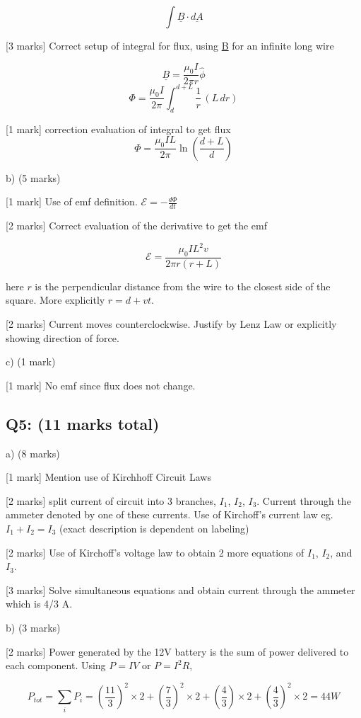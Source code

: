 \documentclass[a4paper,11pt]{article}
\begin{document}
\[ \int \underline{B} \cdot \underline{dA} \]

[3 marks] Correct setup of integral for flux, using \underline{B} for an infinite long wire 
 
\[ \underline{B} = \frac{\mu_0 I}{2\pi r} \hat{\phi} \]
\[ \Phi = \frac{\mu_0 I}{2\pi} \int_{d}^{d+L} \frac{1}{r} \, (L \, dr) \]

[1 mark] correction evaluation of integral to get flux
\[ \Phi = \frac{\mu_0 I L}{2\pi}\ln\left ( \frac{d+L}{d} \right ) \]

b) (5 marks)

[1 mark] Use of emf definition.  \( \mathcal{E} = - \frac{d\Phi}{dt} \)

[2 marks] Correct evaluation of the derivative to get the emf

\[ \mathcal{E} = \frac{\mu_0 I L^2 v}{2\pi r (r+L)} \]

here \( r \) is the perpendicular distance from the wire to the closest side of the square. More explicitly \( r = d + vt \).

[2 marks] Current moves counterclockwise. Justify by Lenz Law or explicitly showing direction of force.

c) (1 mark)

[1 mark] No emf since flux does not change.

\subsection*{Q5: (11 marks total)}

a) (8 marks)

[1 mark] Mention use of Kirchhoff Circuit Laws 

[2 marks] split current of circuit into 3 branches, \( I_1 \), \( I_2 \), \( I_3 \). Current through the ammeter denoted by one of these currents. Use of Kirchoff’s current law eg. \( I_1 + I_2 = I_3 \) (exact description is dependent on labeling)

[2 marks] Use of Kirchoff’s voltage law to obtain 2 more equations of  \( I_1 \), \( I_2 \), and \( I_3 \).

[3 marks] Solve simultaneous equations and obtain current through the ammeter which is 4/3 A. 

b)  (3 marks)

[2 marks] Power generated by the 12V battery is the sum of power delivered to each component. Using \( P = IV \) or \( P = I^2 R \),

\[ P_{tot} = \sum_{i} P_i = \left ( \frac{11}{3} \right )^2 \times 2 + \left ( \frac{7}{3} \right )^2 \times 2 + \left ( \frac{4}{3} \right ) \times 2 + \left ( \frac{4}{3} \right )^2 \times 2 = 44 W \]
\end{document}
